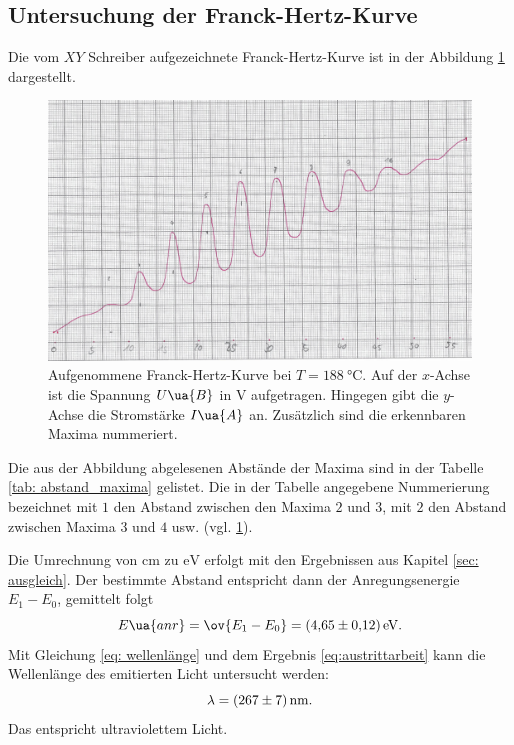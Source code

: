 \subsection{Untersuchung der Franck-Hertz-Kurve}\label{sec: frank} %
\FloatBarrier
Die vom $XY$ Schreiber aufgezeichnete Franck-Hertz-Kurve ist in der Abbildung \ref{fig: messkurve_frank_hertz} dargestellt. %
\begin{figure}
  \centering
  \includegraphics[width=0.8 \textwidth]{./pics/frank_hertz_kurve.png}
  \caption{Aufgenommene Franck-Hertz-Kurve bei $T=\SI{188}{\celsius}$. Auf der $x$-Achse ist die Spannung $U\ua{B}$ in $\si{\volt}$ aufgetragen.
          Hingegen gibt die $y$-Achse die Stromstärke $I\ua{A}$ an. Zusätzlich sind die erkennbaren Maxima nummeriert.}
  \label{fig: messkurve_frank_hertz}
\end{figure}
Die aus der Abbildung abgelesenen Abstände der Maxima sind in der Tabelle \ref{tab: abstand_maxima} gelistet.
Die in der Tabelle angegebene Nummerierung bezeichnet mit $1$ den Abstand zwischen den Maxima $2$ und $3$, mit $2$ den Abstand zwischen Maxima $3$ und $4$ usw. (vgl. \ref{fig: messkurve_frank_hertz}). %

Die Umrechnung von $\si{\centi\meter}$ zu $\si{\eV}$ erfolgt mit den Ergebnissen aus Kapitel \ref{sec: ausgleich}.
Der bestimmte Abstand entspricht dann der Anregungsenergie $E_1-E_0$, gemittelt folgt
\begin{equation}
  \label{eq:austrittarbeit}
E\ua{anr}=\ov{E_1-E_0}=\SI{4.65\pm0.12}{\eV}.
\end{equation}
Mit Gleichung \eqref{eq: wellenlänge} und dem Ergebnis \eqref{eq:austrittarbeit} kann die Wellenlänge des emitierten Licht untersucht werden: %
\begin{equation}
  \label{eq: lambda}
  \lambda=\SI{267\pm7}{\nano\meter}.
\end{equation}
Das entspricht ultraviolettem Licht.


